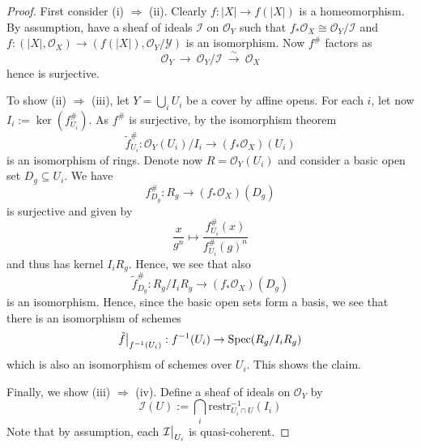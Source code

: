 \documentclass{scrartcl}
\newcommand{\Spec}{\mathrm{Spec}}
\renewcommand{\O}{\mathcal{O}}
\newcommand\restr[2]{{
    \left.\kern-\nulldelimiterspace
    #1
    \vphantom{\big|}
    \right|_{#2}
}}
\theoremstyle{definition}
\begin{document}
\begin{proof}
    First consider (i) $\Rightarrow$ (ii).
    Clearly $f: |X| \to f(|X|)$ is a homeomorphism.
    By assumption, have a sheaf of ideals $\mathcal{I}$ on $\O_Y$ such that $f_*\O_X \cong \O_Y/\mathcal{I}$ and $f: (|X|, \O_X) \to (f(|X|), \O_Y/\mathcal{Y})$ is an isomorphism.
    Now $f^\#$ factors as
    \begin{equation*}
        \O_Y \ \to \ \O_Y / \mathcal{I} \ \overset{\sim}{\to} \ \O_X
    \end{equation*}
    hence is surjective.

    To show (ii) $\Rightarrow$ (iii), let $Y = \bigcup_i U_i$ be a cover by affine opens.
    For each $i$, let now $I_i := \ker(f^\#_{U_i})$.
    As $f^\#$ is surjective, by the isomorphism theorem
    \begin{equation*}
        \tilde{f}^\#_{U_i}: \O_Y(U_i) / I_i \to (f_*\O_X)(U_i)
    \end{equation*}
    is an isomorphism of rings.
    Denote now $R = \O_Y(U_i)$ and consider a basic open set $D_g \subseteq U_i$.
    We have
    \begin{equation*}
        f^\#_{D_g}: R_g \to (f_*\O_X)(D_g)
    \end{equation*}
    is surjective and given by
    \begin{equation*}
        \frac {x} {g^n} \mapsto \frac {f^\#_{U_i}(x)} {f^\#_{U_i}(g)^n}
    \end{equation*}
    and thus has kernel $I_iR_g$.
    Hence, we see that also
    \begin{equation*}
        \tilde{f}^\#_{D_g}: R_g / I_i R_g \to (f_*\O_X)(D_g)
    \end{equation*}
    is an isomorphism.
    Hence, since the basic open sets form a basis, we see that there is an isomorphism of schemes
    \begin{equation*}
        \restr{\tilde{f}}{f^{-1}(U_i)}: f^{-1}(U_i) \to \Spec(R_g/I_iR_g)
    \end{equation*}
    which is also an isomorphism of schemes over $U_i$.
    This shows the claim.

    Finally, we show (iii) $ \Rightarrow$ (iv).
    Define a sheaf of ideals on $\O_Y$ by
    \begin{equation*}
        \mathcal{I}(U) := \bigcap_i \mathrm{restr}^{-1}_{U_i \cap U}(I_i)
    \end{equation*}
    Note that by assumption, each $\restr{\mathcal{I}}{U_i}$ is quasi-coherent.


\end{proof}
\end{document}
